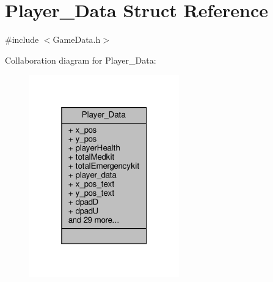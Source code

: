 \hypertarget{structPlayer__Data}{}\section{Player\+\_\+\+Data Struct Reference}
\label{structPlayer__Data}


{\ttfamily \#include $<$Game\+Data.\+h$>$}



Collaboration diagram for Player\+\_\+\+Data\+:
\nopagebreak
\begin{figure}[H]
\begin{center}
\leavevmode
\includegraphics[width=184pt]{structPlayer__Data__coll__graph}
\end{center}
\end{figure}
